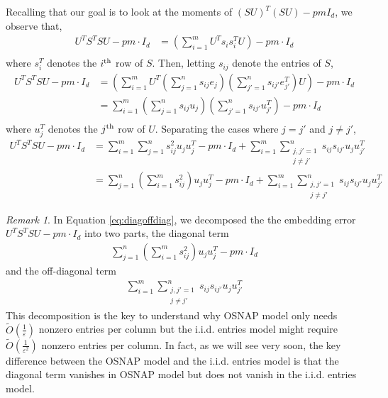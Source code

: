 \documentclass[11pt]{amsart}
\numberwithin{equation}{section}
\numberwithin{equation}{section}
\theoremstyle{remark}
\newtheorem{remark}[theorem]{Remark}
\theoremstyle{definition}
\begin{document}
Recalling that our goal is to look at the moments of $(SU)^T(SU) - pm I_d$, we observe that,
\begin{align*}
    U^TS^TSU - pm\cdot I_d &= \left( \sum_{i=1}^m U^Ts_is_i^TU \right) - pm\cdot I_d \\
\end{align*}
where $s_i^T$ denotes the $i\textsuperscript{th}$ row of $S$. Then, letting $s_{ij}$ denote the entries of $S$, 
\begin{align*}
    U^TS^TSU - pm\cdot I_d &= \left( \sum_{i=1}^m U^T\left( \sum_{j=1}^n s_{ij}e_{j} \right) \left( \sum_{j'=1}^n s_{ij'}e_{j'}^T \right)U \right) - pm\cdot I_d \\
    &=  \sum_{i=1}^m \left( \sum_{j=1}^n s_{ij}u_{j} \right) \left( \sum_{j'=1}^n s_{ij'}u_{j'}^T \right)  - pm\cdot I_d \\
\end{align*}
where $u_j^T$ denotes the $j\textsuperscript{th}$ row of $U$. Separating the cases where $j=j'$ and $j \neq j'$, 
\begin{equation}\label{eq:diagoffdiag}
\begin{aligned}
    U^TS^TSU - pm\cdot I_d &=  \sum_{i=1}^m \sum_{j=1}^n s_{ij}^2 u_ju_j^T  - pm\cdot I_d + \sum_{i=1}^m \sum_{\substack{j,j' =1 \\ j \neq j'}}^n s_{ij}s_{ij'} u_ju_{j'}^T \\
    &=  \sum_{j=1}^n \left( \sum_{i=1}^m s_{ij}^2 \right) u_ju_j^T  - pm\cdot I_d + \sum_{i=1}^m \sum_{\substack{j,j' =1 \\ j \neq j'}}^n s_{ij}s_{ij'} u_ju_{j'}^T
\end{aligned}
\end{equation}
\begin{remark}
    In Equation \eqref{eq:diagoffdiag}, we decomposed the the embedding error $U^TS^TSU - pm\cdot I_d$ into two parts, the diagonal term
    \begin{align*}
        \sum_{j=1}^n \left( \sum_{i=1}^m s_{ij}^2 \right) u_ju_j^T  - pm\cdot I_d
    \end{align*}
    and the off-diagonal term
    \begin{align*}
        \sum_{i=1}^m \sum_{\substack{j,j' =1 \\ j \neq j'}}^n s_{ij}s_{ij'} u_ju_{j'}^T
    \end{align*}
    This decomposition is the key to understand why OSNAP model only needs $\tilde O(\frac{1}{\varepsilon})$ nonzero entries per column but the i.i.d. entries model might require $\tilde O(\frac{1}{\varepsilon^2})$ nonzero entries per column. In fact, as we will see very soon, the key difference between the OSNAP model and the i.i.d. entries model is that the diagonal term vanishes in OSNAP model but does not vanish in the i.i.d. entries model.
\end{remark}
\end{document}
